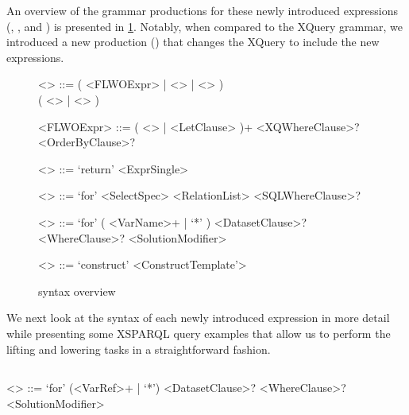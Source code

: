An overview of the grammar productions for these newly introduced expressions (\SQLForClause, \SparqlForClause, and
\ConstructClause) is presented in \cref{fig:xsparql-flwor}.  Notably, when compared to the XQuery grammar, we
introduced a new production (\synt{\XSPARQLFLWORExpr}) that changes the XQuery \FLWORExpr to include the new
expressions.
%
\setlength{\grammarindent}{90pt}%

\begin{figure}[t]
  \centering
  \begin{boxedminipage}{0.935\linewidth}
    {\scriptsize
      \vspace{-\grammarparsep}
      \begin{grammar}
        <\textbf{\XSPARQLFLWORExpr}>       ::= ( <FLWOExpr> | <\SQLForClause> | <\SparqlForClause> ) \\
        ( <\ReturnClause> | <\ConstructClause> )
        
        <FLWOExpr>        ::=  ( <\ForClause> | <LetClause> )+ <XQWhereClause>? <OrderByClause>? 
        
        <\ReturnClause>     ::=  `return' <ExprSingle> 
        
        <\textbf{\SQLForClause}>    ::=  `for' <SelectSpec> <RelationList> <SQLWhereClause>?
        
        <\textbf{\SparqlForClause}>  ::=  `for' ( <VarName>+ | `*' ) <DatasetClause>? <WhereClause>? <SolutionModifier>
        
        <\textbf{\ConstructClause}>  ::=  `construct' <ConstructTemplate'>
      \end{grammar}
    }
    \end{boxedminipage}
  \caption{\XSPARQLFLWORExpr syntax overview}
  \label{fig:xsparql-flwor}
\end{figure}


We next look at the syntax of each newly introduced expression in more detail while presenting some XSPARQL query
examples that allow us to perform the lifting and lowering tasks in a straightforward fashion.


\subsection{\SparqlForClause}
\label{sec:sparqlforclause}
%
{\scriptsize 
  \begin{grammar}
    <\textbf{\SparqlForClause}> ::= `for' (<VarRef>+ | `*') <DatasetClause>? <WhereClause>? <SolutionModifier>
  \end{grammar}
  \vspace{-.5\grammarparsep}
}

